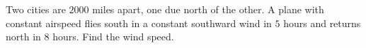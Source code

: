 Two cities are $2000$ miles apart, one due north of the other. A plane with constant airspeed flies south in a constant southward wind in $5$ hours and returns north in $8$ hours. Find the wind speed.
